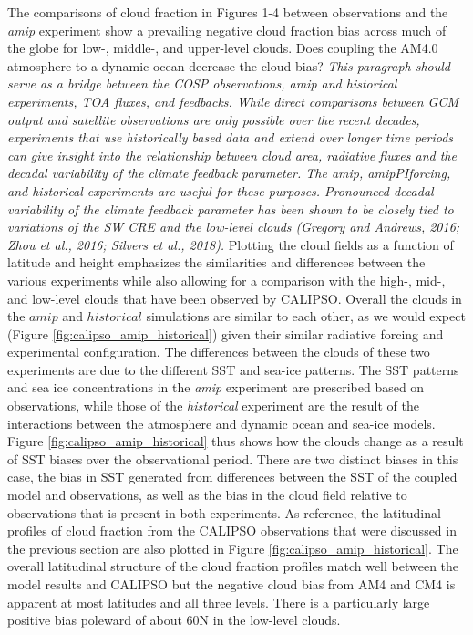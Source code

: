 \documentclass[draft]{agujournal2019}
\begin{document}
The comparisons of cloud fraction in Figures 1-4 between observations and the \textit{amip} experiment show a 
prevailing negative cloud fraction bias across much of the globe for low-, middle-, and upper-level clouds.  Does 
coupling the AM4.0 atmosphere to a dynamic ocean decrease the cloud bias?   
\textit{This paragraph should serve as a bridge between the COSP observations, amip and historical experiments, TOA fluxes, and feedbacks.
While direct comparisons between GCM output and satellite observations are only possible over the recent decades, experiments that use
historically based data and extend over longer time periods can give insight into the relationship between cloud area, radiative fluxes
and the decadal variability of the climate feedback parameter.  The \textit{amip}, \textit{amipPIforcing}, and \textit{historical} experiments are useful
for these purposes.  Pronounced decadal variability of the climate feedback parameter has been shown to be closely tied to 
variations of the SW CRE and the low-level clouds (Gregory and Andrews, 2016; Zhou et al., 2016; Silvers et al., 2018).}
Plotting the cloud fields as a function of latitude and height emphasizes the similarities and differences 
between the various experiments while also allowing for a comparison with the high-, mid-, and low-level clouds 
that have been observed by CALIPSO.  Overall the clouds in the $amip$ and $historical$ simulations are similar to 
each other, as we would expect (Figure \ref{fig:calipso_amip_historical}) given their similar radiative forcing 
and experimental configuration.  The differences between the clouds of 
these two experiments are due to the different SST and sea-ice patterns.  The SST patterns and 
sea ice concentrations in the \textit{amip} experiment are
prescribed based on observations, while those of the \textit{historical} experiment are the result of the 
interactions between the atmosphere and dynamic ocean and sea-ice models.  
Figure \ref{fig:calipso_amip_historical} thus shows how the clouds change 
as a result of SST biases over the observational period.   There are two distinct biases in this case, 
the bias in SST generated from differences between the SST of the coupled model and observations,
as well as the bias in the cloud field relative to observations that is present in both 
experiments.  As reference, the latitudinal profiles of cloud fraction from the CALIPSO observations that 
were discussed in the previous section are also plotted in  Figure \ref{fig:calipso_amip_historical}.
The overall latitudinal structure of the cloud fraction profiles match well between the model results and 
CALIPSO but the negative cloud bias from AM4 and CM4 is apparent at most latitudes and all three levels.  
There is a particularly large positive bias poleward of about 60N in the low-level clouds. 
\end{document}
